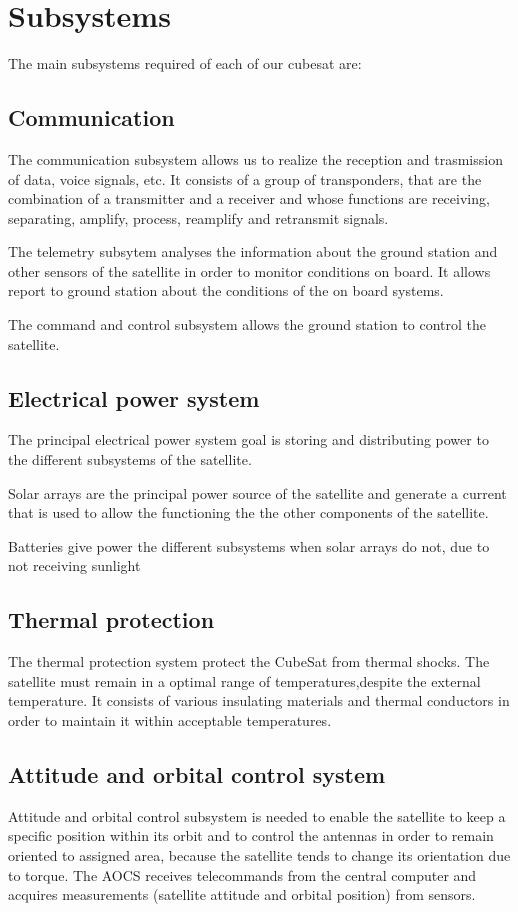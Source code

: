 \section{Subsystems}

The main subsystems required of each of our cubesat are:

\subsection{Communication}
The communication subsystem allows us to realize the reception and trasmission of data, voice signals, etc. It consists of a group of transponders, that are the combination of a transmitter and a receiver and whose functions are receiving, separating, amplify, process, reamplify and retransmit signals.

The telemetry subsytem analyses the information about the ground station and other sensors of the satellite in 	order to monitor conditions on board. It allows report to ground station about the conditions of the on board systems.

The command and control subsystem allows the ground station to control the satellite.
	
\subsection{Electrical power system}
The principal electrical power system  goal is storing and distributing power to the different subsystems of the satellite.

Solar arrays are the principal power source of the satellite and generate a current that is used to allow the functioning the the other components of the satellite.

Batteries give power the different subsystems when solar arrays do not, due to not receiving sunlight
	
\subsection{Thermal protection}
The thermal protection system protect the CubeSat from thermal shocks. The satellite must remain in a optimal range of temperatures,despite the external temperature. It consists of various insulating materials and thermal conductors in order to maintain it within acceptable temperatures.

\subsection{Attitude and orbital control system}
Attitude and orbital control subsystem is needed to enable the satellite to keep a specific position within its orbit and to control the antennas in order to remain oriented to assigned area, because the satellite tends to change its orientation due to torque. The AOCS receives telecommands from the central computer and acquires measurements (satellite attitude and orbital position) from sensors.

%
